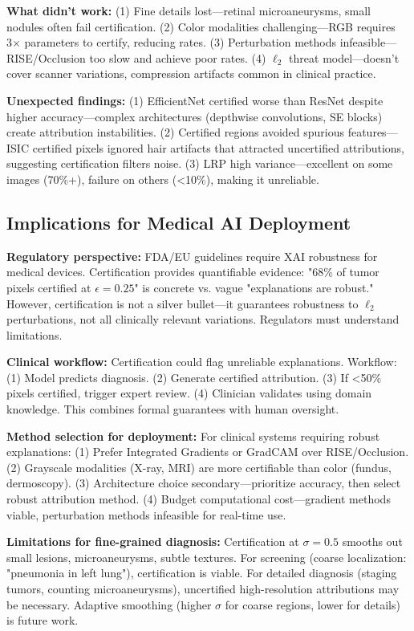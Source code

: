 \documentclass[11pt]{article}
\begin{document}
\textbf{What didn't work:} (1) Fine details lost—retinal microaneurysms, small nodules often fail certification. (2) Color modalities challenging—RGB requires 3× parameters to certify, reducing rates. (3) Perturbation methods infeasible—RISE/Occlusion too slow and achieve poor rates. (4) $\ell_2$ threat model—doesn't cover scanner variations, compression artifacts common in clinical practice.

\textbf{Unexpected findings:} (1) EfficientNet certified worse than ResNet despite higher accuracy—complex architectures (depthwise convolutions, SE blocks) create attribution instabilities. (2) Certified regions avoided spurious features—ISIC certified pixels ignored hair artifacts that attracted uncertified attributions, suggesting certification filters noise. (3) LRP high variance—excellent on some images (70\%+), failure on others (<10\%), making it unreliable.

\subsection{Implications for Medical AI Deployment}

\textbf{Regulatory perspective:} FDA/EU guidelines require XAI robustness for medical devices. Certification provides quantifiable evidence: "68\% of tumor pixels certified at $\epsilon=0.25$" is concrete vs. vague "explanations are robust." However, certification is not a silver bullet—it guarantees robustness to $\ell_2$ perturbations, not all clinically relevant variations. Regulators must understand limitations.

\textbf{Clinical workflow:} Certification could flag unreliable explanations. Workflow: (1) Model predicts diagnosis. (2) Generate certified attribution. (3) If <50\% pixels certified, trigger expert review. (4) Clinician validates using domain knowledge. This combines formal guarantees with human oversight.

\textbf{Method selection for deployment:} For clinical systems requiring robust explanations: (1) Prefer Integrated Gradients or GradCAM over RISE/Occlusion. (2) Grayscale modalities (X-ray, MRI) are more certifiable than color (fundus, dermoscopy). (3) Architecture choice secondary—prioritize accuracy, then select robust attribution method. (4) Budget computational cost—gradient methods viable, perturbation methods infeasible for real-time use.

\textbf{Limitations for fine-grained diagnosis:} Certification at $\sigma=0.5$ smooths out small lesions, microaneurysms, subtle textures. For screening (coarse localization: "pneumonia in left lung"), certification is viable. For detailed diagnosis (staging tumors, counting microaneurysms), uncertified high-resolution attributions may be necessary. Adaptive smoothing (higher $\sigma$ for coarse regions, lower for details) is future work.
\end{document}
